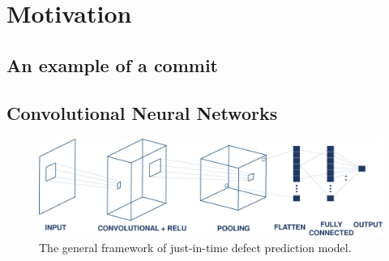 \section{Motivation}
\label{sec:motivation}

\subsection{An example of a commit }
\label{sec:examle}

\subsection{Convolutional Neural Networks}
\label{sec:background_cnn}
\begin{figure}
\center
\includegraphics[scale=0.36]{figs/cnn.pdf}
\caption{The general framework of just-in-time defect prediction model.}
\label{fig:cnn}
\end{figure}
